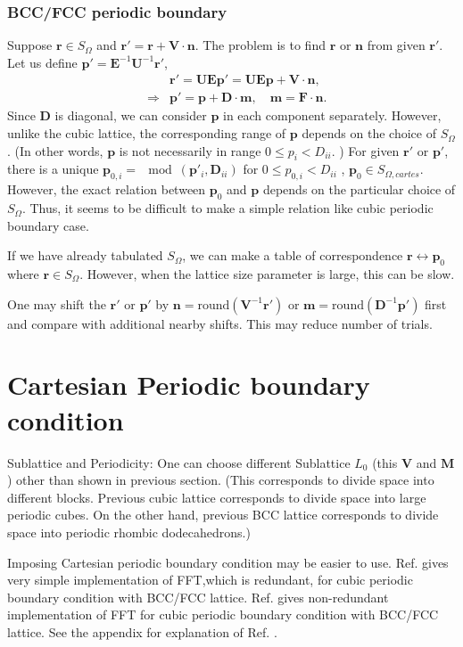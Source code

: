 \documentclass[10pt]{book}
\def\bm{\boldsymbol}
\newcommand{\bea}{\begin{eqnarray}}
\newcommand{\eea}{\end{eqnarray}}
\newcommand{\no}{\nonumber \\}
\def\vn{{\bm n}}
\def\vp{{\bm p}}
\def\vr{{\bm r}}
\begin{document}
\subsubsection{BCC/FCC periodic boundary} 
Suppose $\vr\in S_\Omega$ and $\vr'=\vr+{\bm V}\cdot \vn$.
The problem is to find $\vr$ or $\vn$ from given $\vr'$. 
Let us define $\vp'={\bm E}^{-1}{\bm U}^{-1}\vr'$,
\bea 
& &\vr'={\bm U}{\bm E} {\bm p}'= {\bm U}{\bm E} {\bm p}+{\bm V}\cdot\vn ,\no 
&\Rightarrow & {\bm p}' = {\bm p}+{\bm D}\cdot {\bm m},\quad {\bm m}={\bm F}\cdot{\bm n}.  
\eea 
Since ${\bm D}$ is diagonal, we can consider $\vp$ in each component separately. 
However, unlike the cubic lattice, the corresponding range of $\vp$ depends on the 
choice of $S_\Omega$. (In other words, $\vp$ is not necessarily in range $0\leq p_i < D_{ii}$.  )  
For given $\vr'$ or $\vp'$, 
there is a unique $\vp_{0,i}=\mod(\vp'_i,{\bm D}_{ii})$ for  $0\leq p_{0,i} < D_{ii}$
, $\vp_0\in S_{\Omega,cartes}$. 
However, the exact relation between $\vp_0$ and $\vp$ depends on the particular 
choice of $S_\Omega$. Thus, it seems to be difficult to make a simple relation 
like cubic periodic boundary case.  

If we have already tabulated $S_\Omega$, we can make a table of correspondence 
$\vr\leftrightarrow \vp_0$ where $\vr\in S_\Omega$. However, when the lattice size 
parameter is large, this can be slow.

One may shift the $\vr'$ or $\vp'$ by $\vn=\mbox{round}({\bm V}^{-1}\vr')$ or
${\bm m}=\mbox{round}({\bm D}^{-1}\vp') $ first and compare with additional nearby shifts.
This may reduce number of trials. 



\section{Cartesian Periodic boundary condition} 
{\color{red} Sublattice and Periodicity:} One can choose different Sublattice $L_0$
            (this ${\bm V}$ and ${\bm M}$) other than shown in previous section. 
            (This corresponds to divide space into different blocks.
            Previous cubic lattice corresponds to divide space into large periodic cubes.
            On the other hand, previous BCC lattice 
            corresponds to divide space into periodic rhombic dodecahedrons.)   

Imposing Cartesian periodic boundary condition may be easier to use.
Ref. \cite{CD} gives very simple implementation of FFT,which is redundant, 
for cubic periodic boundary condition with BCC/FCC lattice.
Ref. \cite{Zheng} gives non-redundant implementation of FFT for cubic periodic boundary condition
with BCC/FCC lattice. See the appendix for explanation of Ref. \cite{CD}.
\end{document}
